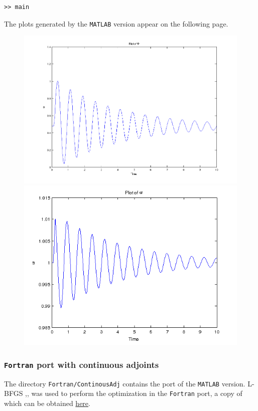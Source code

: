 \begin{lstlisting}[language=mymatlab, numbers=none]
>> main
\end{lstlisting}
\hfill \break
\noindent The plots generated by the \texttt{MATLAB} version appear on the following page.
\clearpage
\begin{figure}[h]
\centering
\includegraphics[width=1.2\linewidth]{../Code/miniApps/power_grid/phi_matlab.png}
\label{fig:plot_of_phi_matlab}
\includegraphics[width=1.2\linewidth]{../Code/miniApps/power_grid/omega_matlab.png}
\label{fig:plot_of_omega_matlab}
\end{figure}
\clearpage
\subsubsection{\texttt{Fortran} port with continuous adjoints}\label{sec_fortran_port_power}
The directory \texttt{Fortran/ContinousAdj} contains the port of the \texttt{MATLAB} version. L-BFGS \cite{Byrd_1996},\cite{Zhu_1997},\cite{Morales_2011} was used to perform the optimization in the \texttt{Fortran} port, a copy of which can be obtained \href{http://users.iems.northwestern.edu/~nocedal/lbfgsb.html}{here}.\\

